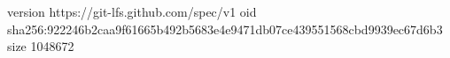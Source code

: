 version https://git-lfs.github.com/spec/v1
oid sha256:922246b2caa9f61665b492b5683e4e9471db07ce439551568cbd9939ec67d6b3
size 1048672
